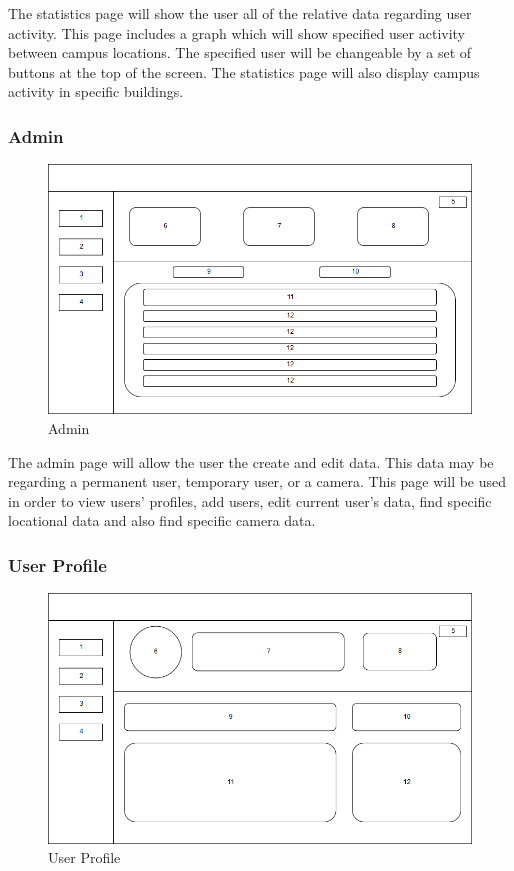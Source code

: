 \documentclass[
  english,
  a4paper,
,tablecaptionabove
]{scrartcl}
\begin{document}
The statistics page will show the user all of the relative data
regarding user activity. This page includes a graph which will show
specified user activity between campus locations. The specified user
will be changeable by a set of buttons at the top of the screen. The
statistics page will also display campus activity in specific
buildings.\\
\newpage

\hypertarget{admin}{%
\subsubsection{Admin}\label{admin}}

\begin{figure}
\centering
\includegraphics{images/ppm-images/admin-design.png}
\caption{Admin}
\end{figure}

The admin page will allow the user the create and edit data. This data
may be regarding a permanent user, temporary user, or a camera. This
page will be used in order to view users' profiles, add users, edit
current user's data, find specific locational data and also find
specific camera data.\\
\newpage

\hypertarget{user-profile}{%
\subsubsection{User Profile}\label{user-profile}}

\begin{figure}
\centering
\includegraphics{images/ppm-images/profile-design.png}
\caption{User Profile}
\end{figure}
\end{document}

